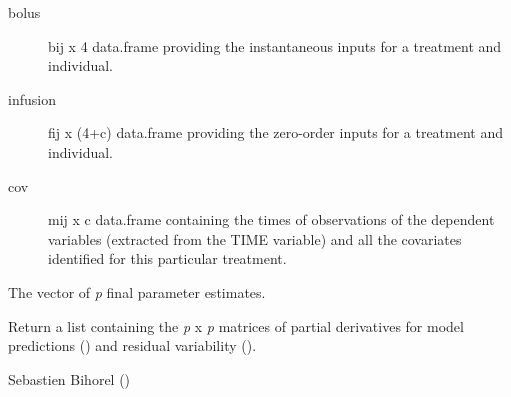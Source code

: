 \begin{Arguments}
\begin{ldescription}
\begin{description}
\begin{description}
\end{description}


\item[bolus] bij x 4 data.frame providing the instantaneous inputs for a
treatment and individual.
\item[infusion] fij x (4+c) data.frame providing the zero-order inputs for a
treatment and individual.
\item[cov] mij x c data.frame containing the times of observations of the 
dependent variables (extracted from the TIME variable) and all the
covariates identified for this particular treatment.

\end{description}


\item[\code{x}] The vector of \emph{p} final parameter estimates.
\end{ldescription}
\end{Arguments}
%
\begin{Value}
Return a list containing the \emph{p} x \emph{p} matrices of partial
derivatives for model predictions () and residual variability
().
\end{Value}
%
\begin{Author}\relax
Sebastien Bihorel ()
\end{Author}
%
\begin{SeeAlso}\relax
{}
\end{SeeAlso}
